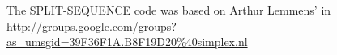 
 

The SPLIT-SEQUENCE code was based on Arthur Lemmens' in
\url{http://groups.google.com/groups?as_umsgid=39F36F1A.B8F19D20%40simplex.nl}
